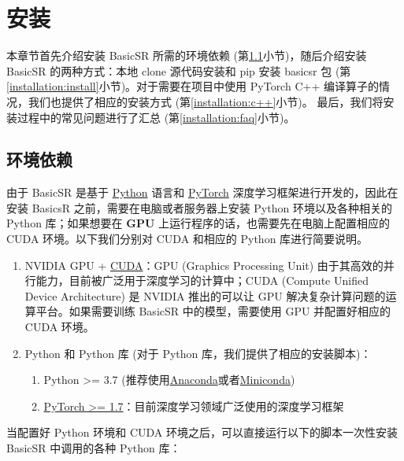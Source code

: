 \documentclass[../main.tex]{subfiles}
\begin{document}
\chapter{安装}
\vspace{-2cm}

本章节首先介绍安装 BasicSR 所需的环境依赖 (第\ref{installation:env-reqirement}小节)，随后介绍安装 BasicSR 的两种方式：本地 clone 源代码安装和 pip 安装 basicsr 包 (第\ref{installation:install}小节)。对于需要在项目中使用 PyTorch C++ 编译算子的情况，我们也提供了相应的安装方式 (第\ref{installation:c++}小节)。
最后，我们将安装过程中的常见问题进行了汇总 (第\ref{installation:faq}小节)。

\section{环境依赖}
\label{installation:env-reqirement}

由于 BasicSR 是基于 \href{https://www.python.org/}{Python} 语言和 \href{https://pytorch.org/}{PyTorch} 深度学习框架进行开发的，因此在安装 BasicsR 之前，需要在电脑或者服务器上安装 Python 环境以及各种相关的 Python 库；如果想要在 \textbf{GPU} 上运行程序的话，也需要先在电脑上配置相应的 CUDA 环境。以下我们分别对 CUDA 和相应的 Python 库进行简要说明。

\begin{enumerate}
    \item NVIDIA GPU + \href{https://developer.nvidia.com/cuda-downloads}{CUDA}：GPU (Graphics Processing Unit) 由于其高效的并行能力，目前被广泛用于深度学习的计算中；CUDA (Compute Unified Device Architecture) 是 NVIDIA 推出的可以让 GPU 解决复杂计算问题的运算平台。如果需要训练 BasicSR 中的模型，需要使用 GPU 并配置好相应的 CUDA 环境。
    \item Python 和 Python 库 (对于 Python 库，我们提供了相应的安装脚本)：
    \begin{enumerate}
        \item Python >= 3.7 (推荐使用\href{https://www.anaconda.com/products/distribution#linux}{Anaconda}或者\href{https://docs.conda.io/en/latest/miniconda.html}{Miniconda})
        \item \href{https://pytorch.org/}{PyTorch >= 1.7}：目前深度学习领域广泛使用的深度学习框架
    \end{enumerate}
\end{enumerate}

当配置好 Python 环境和 CUDA 环境之后，可以直接运行以下的脚本一次性安装 BasicSR 中调用的各种 Python 库：
\end{document}
